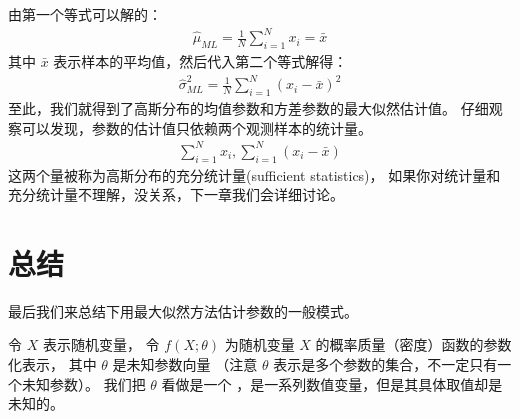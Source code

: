 \documentclass[letterpaper,10pt,english]{sphinxmanual}
\begin{document}
由第一个等式可以解的：
\begin{equation}\label{equation:最大似然估计/content:最大似然估计/content:21}
\begin{split}\hat{\mu}_{ML} = \frac{1}{N} \sum_{i=1}^N x_i = \bar{x}\end{split}
\end{equation}
其中 \(\bar{x}\) 表示样本的平均值，然后代入第二个等式解得：
\begin{equation}\label{equation:最大似然估计/content:最大似然估计/content:22}
\begin{split}\hat{\sigma}^2_{ML} = \frac{1}{N} \sum_{i=1}^N (x_i-\bar{x})^2\end{split}
\end{equation}
至此，我们就得到了高斯分布的均值参数和方差参数的最大似然估计值。
仔细观察可以发现，参数的估计值只依赖两个观测样本的统计量。
\begin{equation}\label{equation:最大似然估计/content:最大似然估计/content:23}
\begin{split}\sum_{i=1}^N x_i,\sum_{i=1}^N (x_i-\bar{x})\end{split}
\end{equation}
这两个量被称为高斯分布的充分统计量(sufficient statistics)，
如果你对统计量和充分统计量不理解，没关系，下一章我们会详细讨论。


\section{总结}
\label{\detokenize{_u6700_u5927_u4f3c_u7136_u4f30_u8ba1/content:id6}}
最后我们来总结下用最大似然方法估计参数的一般模式。

令 \(X\) 表示随机变量，
令 \(f(X;\theta)\) 为随机变量 \(X\) 的概率质量（密度）函数的参数化表示，
其中 \(\theta\) 是未知参数向量
（注意 \(\theta\) 表示是多个参数的集合，不一定只有一个未知参数）。
我们把 \(\theta\) 看做是一个  ，是一系列数值变量，但是其具体取值却是未知的。
\end{document}
